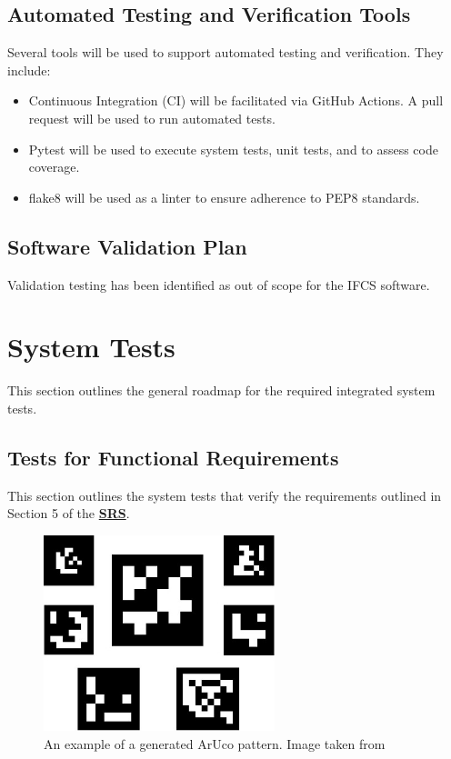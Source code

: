 \documentclass[12pt, titlepage]{article}
\begin{document}
\subsection{Automated Testing and Verification Tools}
Several tools will be used to support automated testing and verification. They include:
\begin{itemize}
\item Continuous Integration (CI) will be facilitated via GitHub Actions. A pull request will be used 
to run automated tests.
\item Pytest will be used to execute system tests, unit tests, and to assess code coverage. 
\item flake8 will be used as a linter to ensure adherence to PEP8 standards. 
\end{itemize}

\subsection{Software Validation Plan}
Validation testing has been identified as out of scope for the IFCS software.

\section{System Tests}\label{Sys_Tests}
This section outlines the general roadmap for the required integrated system tests. 
\subsection{Tests for Functional Requirements} \label{FR_Tests}
This section outlines the system tests that verify the requirements outlined in 
Section 5 of the 
\textbf{\href{https://github.com/KiranSingh15/CAS-741-Image-Correspondences/blob/main/docs/SRS/SRS.pdf}
{SRS}}. 

\begin{figure}[h!]
  \begin{center}
   \includegraphics[width=0.6\textwidth]{images/ArUco_Field_Gen.jpg}
  \caption[An example of a generated ArUco pattern]{An example of a generated ArUco pattern. Image taken 
  from \cite{ARUCO_Markers_openCV}}
  \label{gen_aruco} 
  \end{center}
\end{figure}
\end{document}
